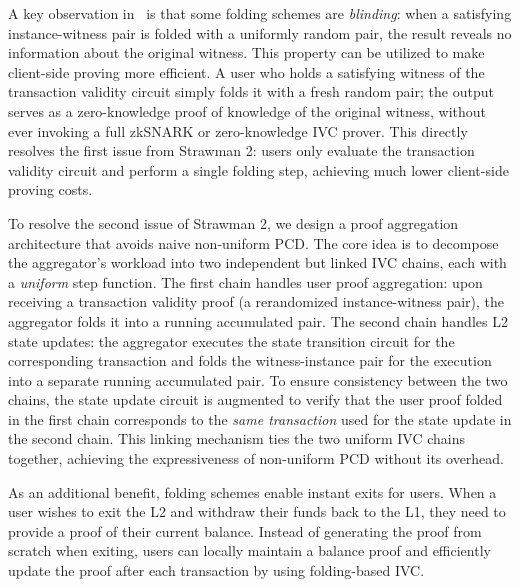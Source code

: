 A key observation in~\cite{C:KotSet24} is that some folding schemes are \textit{blinding}: when a satisfying instance-witness pair is folded with a uniformly random pair, the result reveals no information about the original witness.
This property can be utilized to make client-side proving more efficient.
A user who holds a satisfying witness of the transaction validity circuit simply folds it with a fresh random pair; the output serves as a zero-knowledge proof of knowledge of the original witness, without ever invoking a full \ac{zkSNARK} or zero-knowledge \ac{IVC} prover.
This directly resolves the first issue from Strawman 2: users only evaluate the transaction validity circuit and perform a single folding step, achieving much lower client-side proving costs.

To resolve the second issue of Strawman 2, we design a proof aggregation architecture that avoids naive non-uniform \ac{PCD}.
The core idea is to decompose the aggregator's workload into two independent but linked \ac{IVC} chains, each with a \textit{uniform} step function.
The first chain handles user proof aggregation: upon receiving a transaction validity proof (a rerandomized instance-witness pair), the aggregator folds it into a running accumulated pair.
The second chain handles \ac{L2} state updates: the aggregator executes the state transition circuit for the corresponding transaction and folds the witness-instance pair for the execution into a separate running accumulated pair.
To ensure consistency between the two chains, the state update circuit is augmented to verify that the user proof folded in the first chain corresponds to the \textit{same transaction} used for the state update in the second chain.
This linking mechanism ties the two uniform \ac{IVC} chains together, achieving the expressiveness of non-uniform \ac{PCD} without its overhead.

As an additional benefit, folding schemes enable instant exits for users.
When a user wishes to exit the \ac{L2} and withdraw their funds back to the \ac{L1}, they need to provide a proof of their current balance.
Instead of generating the proof from scratch when exiting, users can locally maintain a balance proof and efficiently update the proof after each transaction by using folding-based IVC.

